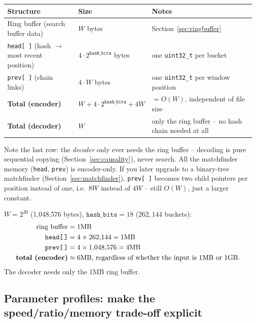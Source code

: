 \documentclass[11pt]{article}
\begin{document}
\begin{center}
\begin{tabular}{@{}p{5.2cm}p{4.3cm}p{4.3cm}@{}}
\toprule
Structure & Size & Notes \\
\midrule
Ring buffer (search buffer data) & $W$ bytes & Section~\ref{sec:ringbuffer} \\
\texttt{head[\,]} (hash $\to$ most recent position) & $4 \cdot 2^{\texttt{hash\_bits}}$ bytes & one \texttt{uint32\_t} per bucket \\
\texttt{prev[\,]} (chain links) & $4 \cdot W$ bytes & one \texttt{uint32\_t} per window position \\
\midrule
\textbf{Total (encoder)} & $W + 4 \cdot 2^{\texttt{hash\_bits}} + 4W$ & $= O(W)$, independent of file size \\
\textbf{Total (decoder)} & $W$ & only the ring buffer -- no hash chain needed at all \\
\bottomrule
\end{tabular}
\end{center}

Note the last row: the \emph{decoder} only ever needs the ring buffer -- decoding is
pure sequential copying (Section~\ref{sec:causality}), never search. All the matchfinder
memory (\texttt{head}, \texttt{prev}) is encoder-only. If you later upgrade to a
binary-tree matchfinder (Section~\ref{sec:matchfinder}), \texttt{prev[\,]} becomes two
child pointers per position instead of one, i.e.\ $8W$ instead of $4W$ -- still $O(W)$,
just a larger constant.

\begin{tcolorbox}[colback=green!5!white,colframe=green!45!black,title=Worked example: memory for a 1MB window]
$W = 2^{20}$ (1{,}048{,}576 bytes), $\texttt{hash\_bits} = 18$ ($262{,}144$ buckets):
\begin{align*}
  \text{ring buffer} &= 1\text{MB} \\
  \texttt{head[\,]} &= 4 \times 262{,}144 = 1\text{MB} \\
  \texttt{prev[\,]} &= 4 \times 1{,}048{,}576 = 4\text{MB} \\
  \textbf{total (encoder)} &\approx 6\text{MB, regardless of whether the input is 1MB or 1GB.}
\end{align*}
The decoder needs only the 1MB ring buffer.
\end{tcolorbox}

\subsection{Parameter profiles: make the speed/ratio/memory trade-off explicit}
\label{sec:profiles}
\end{document}
